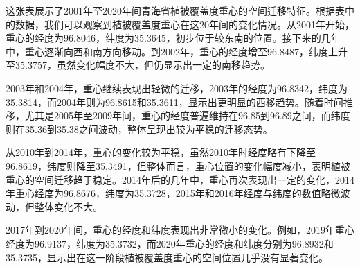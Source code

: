 \documentclass{article}
\begin{document}
		这张表展示了2001年至2020年间青海省植被覆盖度重心的空间迁移特征。根据表中的数据，我们可以观察到植被覆盖度重心在这20年间的变化情况。从2001年开始，重心的经度为96.8046，纬度为35.3645，初步位于较东南的位置。接下来的几年中，重心逐渐向西和南方向移动。到2002年，重心的经度增至96.8487，纬度上升至35.3757，虽然变化幅度不大，但仍显示出一定的南移趋势。
		
		2003年和2004年，重心继续表现出轻微的迁移，2003年的经度为96.8342，纬度为35.3814，而2004年则为96.8615和35.3611，显示出更明显的西移趋势。随着时间推移，尤其是2005年至2009年间，重心的经度普遍维持在96.85到96.89之间，而纬度则在35.36到35.38之间波动，整体呈现出较为平稳的迁移态势。
		
		从2010年到2014年，重心的变化较为平稳，虽然2010年时经度略有下降至96.8619，纬度则降至35.3491，但整体而言，重心位置的变化幅度减小，表明植被重心的空间迁移趋于稳定。2014年后的几年中，重心再次表现出一定的变化，2014年重心经度为96.8676，纬度为35.3728，2015年和2016年经度与纬度的数值略微波动，但整体变化不大。
		
		2017年到2020年间，重心的经度和纬度表现出非常微小的变化。例如，2019年重心经度为96.9137，纬度为35.3732，而2020年重心的经度和纬度分别为96.8932和35.3735，显示出在这一阶段植被覆盖度重心的空间位置几乎没有显著变化。
		
\end{document}
